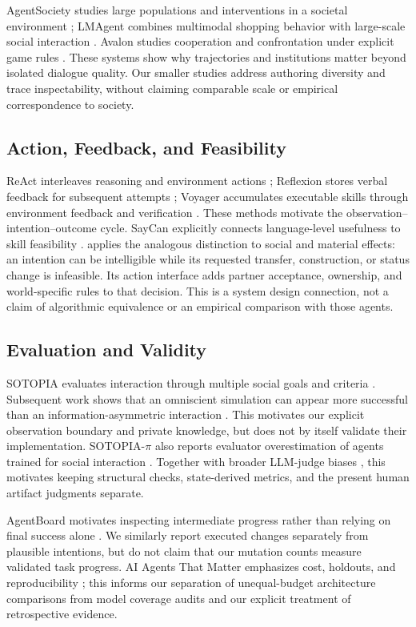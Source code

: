 AgentSociety studies large populations and interventions in a societal
environment \cite{agentsociety}; LMAgent combines multimodal shopping behavior
with large-scale social interaction \cite{lmagent}. Avalon studies cooperation
and confrontation under explicit game rules \cite{avalon}. These systems show
why trajectories and institutions matter beyond isolated dialogue quality.
Our smaller studies address authoring diversity and trace inspectability,
without claiming comparable scale or empirical correspondence to society.

\subsection{Action, Feedback, and Feasibility}
ReAct interleaves reasoning and environment actions \cite{react}; Reflexion
stores verbal feedback for subsequent attempts \cite{reflexion}; Voyager
accumulates executable skills through environment feedback and verification
\cite{voyager}. These methods motivate the observation--intention--outcome
cycle. SayCan explicitly connects language-level usefulness to skill
feasibility \cite{saycan}. \agora applies the analogous distinction to social
and material effects: an intention can be intelligible while its requested
transfer, construction, or status change is infeasible. Its action interface
adds partner acceptance, ownership, and world-specific rules to that decision.
This is a system design connection, not a claim of algorithmic equivalence or
an empirical comparison with those agents.

\subsection{Evaluation and Validity}
SOTOPIA evaluates interaction through multiple social goals and criteria
\cite{zhou2024}. Subsequent work shows that an omniscient simulation can appear
more successful than an information-asymmetric interaction \cite{misleading}.
This motivates our explicit observation boundary and private knowledge, but
does not by itself validate their implementation. SOTOPIA-$\pi$ also reports evaluator overestimation of agents trained for
social interaction \cite{sotopiapi}. Together with broader LLM-judge biases
\cite{judge}, this motivates keeping structural checks, state-derived metrics,
and the present human artifact judgments separate.

AgentBoard motivates inspecting intermediate progress rather than relying on
final success alone \cite{agentboard}. We similarly report executed changes
separately from plausible intentions, but do not claim that our mutation
counts measure validated task progress. AI Agents That Matter emphasizes
cost, holdouts, and reproducibility \cite{agentsmatter}; this informs our
separation of unequal-budget architecture comparisons from model coverage
audits and our explicit treatment of retrospective evidence.

